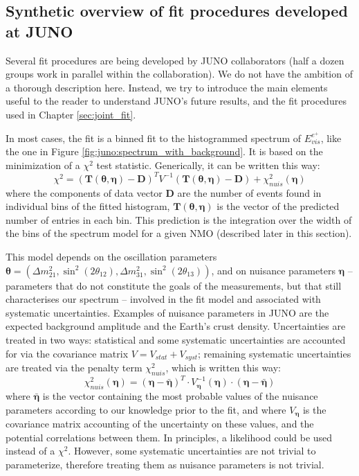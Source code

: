 \documentclass[../main.tex]{subfiles}
\begin{document}
\subsection{Synthetic overview of fit procedures developed at JUNO}
\label{sec:juno:fit:subatech}

Several fit procedures are being developed by JUNO collaborators (half a dozen groups work in parallel within the collaboration). We do not have the ambition of a thorough description here. Instead, we try to introduce the main elements useful to the reader to understand JUNO's future results, and the fit procedures used in Chapter \ref{sec:joint_fit}.

In most cases, the fit is a binned fit to the histogrammed spectrum of $E_{vis}^{e^+}$, like the one in Figure \ref{fig:juno:spectrum_with_background}. It is based on the minimization of a $\chi^2$ test statistic. Generically, it can be written this way:
\begin{equation}
  \label{eq:juno:chi2}
  \chi^2= \left(\bm{T}(\bm{\theta},\bm{\eta}) - \bm{D}  \right)^T V^{-1} \left(\bm{T}(\bm{\theta},\bm{\eta}) - \bm{D} \right) + \chi^2_{nuis}(\bm{\eta})
\end{equation}
where the components of data vector $\bm{D}$ are the number of events found in individual bins of the fitted histogram, $\bm{T}(\bm{\theta},\bm{\eta})$ is the vector of the predicted number of entries in each bin. This prediction is the integration over the width of the bins of the spectrum model for a given NMO (described later in this section).

This model depends on the oscillation parameters $\bm{\theta} = \left(\Delta m^2_{21}, \sin^2(2\theta_{12}), \Delta m^2_{31}, \sin^2(2\theta_{13} )\right)$, and on nuisance parameters $\bm{\eta}$ -- parameters that do not constitute the goals of the measurements, but that still characterises our spectrum -- involved in the fit model and associated with systematic uncertainties. Examples of nuisance parameters in JUNO are the expected background amplitude and the Earth's crust density.
Uncertainties are treated in two ways: statistical and some systematic uncertainties are accounted for via the covariance matrix $V = V_{stat}+V_{syst}$; remaining systematic uncertainties are treated via the penalty term $\chi^2_{nuis}$, which is written this way:
\begin{equation}
  \label{eq:juno:nuis}
  \chi^2_{nuis}\left(\bm{\eta}\right)= \left(\bm{\eta}-\bm{\bar{\eta}}\right)^T \cdot V^{-1}_{\bm{\eta}}(\bm{\eta})  \cdot \left(\bm{\eta}-\bm{\bar{\eta}}\right)
\end{equation}
where $\bm{\bar{\eta}}$ is the vector containing the most probable values of the nuisance parameters according to our knowledge prior to the fit, and where $V_{\bm{\eta}}$ is the covariance matrix accounting of the uncertainty on these values, and the potential correlations between them.
In principles, a likelihood could be used instead of a $\chi^2$. However, some systematic uncertainties are not trivial to parameterize, therefore treating them as nuisance parameters is not trivial.
\end{document}
